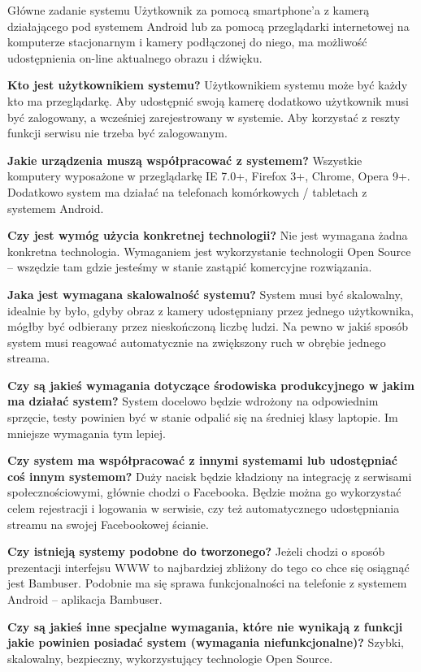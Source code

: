 \begin{userstory}{Główne zadanie systemu}
Użytkownik za pomocą smartphone'a z kamerą działającego pod systemem Android lub za pomocą przeglądarki internetowej na komputerze stacjonarnym i kamery podłączonej do niego, ma możliwość udostępnienia on-line aktualnego obrazu i dźwięku.
    \begin{questions}
        \item{
            \textbf{Kto jest użytkownikiem systemu?} Użytkownikiem systemu może być każdy kto ma przeglądarkę. Aby udostępnić swoją kamerę dodatkowo użytkownik musi być zalogowany, a wcześniej zarejestrowany w systemie. Aby korzystać z reszty funkcji serwisu nie trzeba być zalogowanym.
        }
        \item{
            \textbf{Jakie urządzenia muszą współpracować z systemem?} Wszystkie komputery wyposażone w przeglądarkę IE 7.0+, Firefox 3+, Chrome, Opera 9+. Dodatkowo system ma działać na telefonach komórkowych / tabletach z systemem Android.
        }
        \item{
            \textbf{Czy jest wymóg użycia konkretnej technologii?} Nie jest wymagana żadna konkretna technologia. Wymaganiem jest wykorzystanie technologii Open Source -- wszędzie tam gdzie jesteśmy w stanie zastąpić komercyjne rozwiązania.
        }
        \item{
            \textbf{Jaka jest wymagana skalowalność systemu?} System musi być skalowalny, idealnie by było, gdyby obraz z kamery udostępniany przez jednego użytkownika, mógłby być odbierany przez nieskończoną liczbę ludzi. Na pewno w jakiś sposób system musi reagować automatycznie na zwiększony ruch w obrębie jednego streama.
        }
        \item{
            \textbf{Czy są jakieś wymagania dotyczące środowiska produkcyjnego w jakim ma działać system?} System docelowo będzie wdrożony na odpowiednim sprzęcie, testy powinien być w stanie odpalić się na średniej klasy laptopie. Im mniejsze wymagania tym lepiej.
        }
        \item{
            \textbf{Czy system ma współpracować z innymi systemami lub udostępniać coś innym systemom?} Duży nacisk będzie kładziony na integrację z serwisami społecznościowymi, głównie chodzi o Facebooka. Będzie można go wykorzystać celem rejestracji i logowania w serwisie, czy też automatycznego udostępniania streamu na swojej Facebookowej ścianie.
        }
        \item{
            \textbf{Czy istnieją systemy podobne do tworzonego?} Jeżeli chodzi o sposób prezentacji interfejsu WWW to najbardziej zbliżony do tego co chce się osiągnąć jest Bambuser. Podobnie ma się sprawa funkcjonalności na telefonie z systemem Android -- aplikacja Bambuser.
        }
        \item{
            \textbf{Czy są jakieś inne specjalne wymagania, które nie wynikają z funkcji jakie powinien posiadać system (wymagania niefunkcjonalne)?} Szybki, skalowalny, bezpieczny, wykorzystujący technologie Open Source.
        }
    \end{questions}
\end{userstory}

